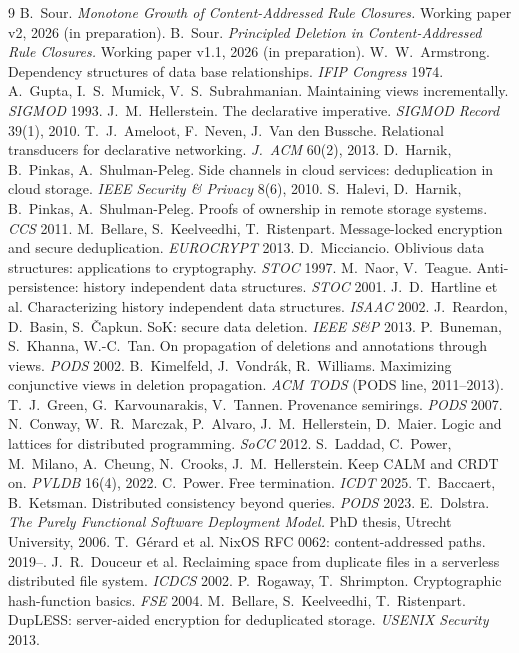 \documentclass[10pt]{article}
\begin{document}
\begin{thebibliography}{9}\small
{} B.~Sour. \emph{Monotone Growth of Content-Addressed Rule Closures.} Working paper v2, 2026 (in preparation).
 B.~Sour. \emph{Principled Deletion in Content-Addressed Rule Closures.} Working paper v1.1, 2026 (in preparation).
 W.~W.~Armstrong. Dependency structures of data base relationships. \emph{IFIP Congress} 1974.
 A.~Gupta, I.~S.~Mumick, V.~S.~Subrahmanian. Maintaining views incrementally. \emph{SIGMOD} 1993.
 J.~M.~Hellerstein. The declarative imperative. \emph{SIGMOD Record} 39(1), 2010.
 T.~J.~Ameloot, F.~Neven, J.~Van den Bussche. Relational transducers for declarative networking. \emph{J.~ACM} 60(2), 2013.
 D.~Harnik, B.~Pinkas, A.~Shulman-Peleg. Side channels in cloud services: deduplication in cloud storage. \emph{IEEE Security \& Privacy} 8(6), 2010.
 S.~Halevi, D.~Harnik, B.~Pinkas, A.~Shulman-Peleg. Proofs of ownership in remote storage systems. \emph{CCS} 2011.
 M.~Bellare, S.~Keelveedhi, T.~Ristenpart. Message-locked encryption and secure deduplication. \emph{EUROCRYPT} 2013.
 D.~Micciancio. Oblivious data structures: applications to cryptography. \emph{STOC} 1997.
 M.~Naor, V.~Teague. Anti-persistence: history independent data structures. \emph{STOC} 2001.
 J.~D.~Hartline et al. Characterizing history independent data structures. \emph{ISAAC} 2002.
 J.~Reardon, D.~Basin, S.~\v{C}apkun. SoK: secure data deletion. \emph{IEEE S\&P} 2013.
 P.~Buneman, S.~Khanna, W.-C.~Tan. On propagation of deletions and annotations through views. \emph{PODS} 2002.
 B.~Kimelfeld, J.~Vondr\'ak, R.~Williams. Maximizing conjunctive views in deletion propagation. \emph{ACM TODS} (PODS line, 2011--2013).
 T.~J.~Green, G.~Karvounarakis, V.~Tannen. Provenance semirings. \emph{PODS} 2007.
 N.~Conway, W.~R.~Marczak, P.~Alvaro, J.~M.~Hellerstein, D.~Maier. Logic and lattices for distributed programming. \emph{SoCC} 2012.
 S.~Laddad, C.~Power, M.~Milano, A.~Cheung, N.~Crooks, J.~M.~Hellerstein. Keep CALM and CRDT on. \emph{PVLDB} 16(4), 2022.
 C.~Power. Free termination. \emph{ICDT} 2025.
 T.~Baccaert, B.~Ketsman. Distributed consistency beyond queries. \emph{PODS} 2023.
 E.~Dolstra. \emph{The Purely Functional Software Deployment Model.} PhD thesis, Utrecht University, 2006.
 T.~G\'erard et al. NixOS RFC 0062: content-addressed paths. 2019--.
 J.~R.~Douceur et al. Reclaiming space from duplicate files in a serverless distributed file system. \emph{ICDCS} 2002.
 P.~Rogaway, T.~Shrimpton. Cryptographic hash-function basics. \emph{FSE} 2004.
 M.~Bellare, S.~Keelveedhi, T.~Ristenpart. DupLESS: server-aided encryption for deduplicated storage. \emph{USENIX Security} 2013.
\end{thebibliography}
\end{document}
